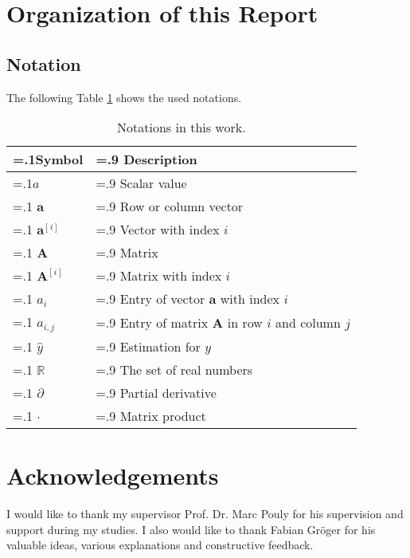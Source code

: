 
\section{Organization of this Report}
\subsection{Notation}
The following Table \ref{tab:notation} shows the used notations.

\begin{table}[H]
\centering
\caption{Notations in this work.\label{tab:notation}}
\begin{tabularx}{\textwidth}{|
 >{\hsize=.1\hsize}X |
 >{\hsize=.9\hsize}X |
}
\hline
\textbf{Symbol} & \textbf{Description} \\ \hline
$a$ & Scalar value \\ \hline 
$\mathbf{a}$ & Row or column vector \\ \hline
$\mathbf{a}^{[i]}$ & Vector with index $i$  \\ \hline
$\mathbf{A}$ & Matrix \\ \hline 
$\mathbf{A}^{[i]}$ & Matrix with index $i$ \\ \hline 
$a_i$ & Entry of vector $\mathbf{a}$ with index $i$ \\ \hline 
$a_{i,j}$ & Entry of matrix $\mathbf{A}$ in row $i$ and column $j$ \\ \hline
$\hat{y}$ & Estimation for $y$ \\ \hline 
$\mathbb{R}$ & The set of real numbers \\ \hline
$\partial$ & Partial derivative \\ \hline
$\cdot$ & Matrix product \\ \hline
\end{tabularx}
\end{table}

\section{Acknowledgements}
I would like to thank my supervisor Prof. Dr. Marc Pouly for his supervision and support during my studies. I also would like to thank Fabian Gröger for his valuable ideas, various explanations and constructive feedback.
